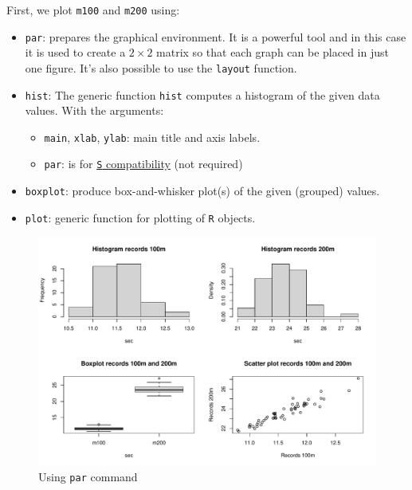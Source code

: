 \documentclass[a4paper]{article}
\newcommand{\highspace}{\vspace{1.2em}\noindent}
\begin{document}
    \highspace
    First, we plot \texttt{m100} and \texttt{m200} using:
    \begin{itemize}
        \item \texttt{par}: prepares the graphical environment. It is a powerful tool and in this case it is used to create a $2 \times 2$ matrix so that each graph can be placed in just one figure. It's also possible to use the \texttt{layout} function.

        \item \texttt{hist}: The generic function \texttt{hist} computes a histogram of the given data values. With the arguments:
        \begin{itemize}
            \item \texttt{main}, \texttt{xlab}, \texttt{ylab}: main title and axis labels.
            
            \item \texttt{par}: is for \href{https://en.wikipedia.org/wiki/S_%28programming_language%29}{\texttt{S} compatibility} (not required)
        \end{itemize}

        \item \texttt{boxplot}: produce box-and-whisker plot(s) of the given (grouped) values.

        \item \texttt{plot}: generic function for plotting of \texttt{R} objects.
    \end{itemize}
    

    \newpage

    \begin{figure}[!htp]
        \centering
        \includegraphics[width=\textwidth]{img/example-analysis-of-quantitative-data-3.pdf}
        \caption*{Using \texttt{par} command}
    \end{figure}
\end{document}
